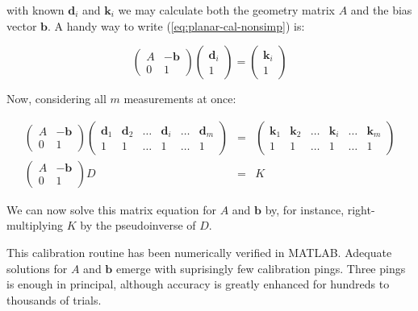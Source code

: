\documentclass[10pt]{article}
\begin{document}
with known \(\mathbf d_i\) and \(\mathbf k_i\) we may calculate both the geometry matrix \(A\) and the bias vector \(\mathbf b\).  A handy way to write (\ref{eq:planar-cal-nonsimp}) is:

\begin{equation}
\label{eq:planar-cal-nonsimp}
\left(\begin{array}{cc}
A & -\mathbf b \\
0 & 1
\end{array}\right)
\left(\begin{array}{c}
\mathbf d_i \\
1
\end{array}\right)
 = 
\left(\begin{array}{c}
\mathbf k_i \\
1
\end{array}\right)
\end{equation}

Now, considering all \(m\) measurements at once:

\begin{eqnarray*}
\label{eq:planar-cAL-simp}
\left(\begin{array}{cc}
A & -\mathbf b \\
0 & 1
\end{array}\right)
\left(\begin{array}{cccccc}
\mathbf d_1 & \mathbf d_2 & \dots & \mathbf d_i & \dots & \mathbf d_m\\
1 & 1 & \dots & 1 & \dots & 1
\end{array}\right) &=&
\left(\begin{array}{cccccc}
\mathbf k_1 & \mathbf k_2 & \dots & \mathbf k_i & \dots & \mathbf k_m\\
1 & 1 & \dots & 1 & \dots & 1
\end{array}\right) \\
\left(\begin{array}{cc}
A & -\mathbf b \\
0 & 1
\end{array}\right) D &=& K
\end{eqnarray*}

We can now solve this matrix equation for \(A\) and \(\mathbf b\) by, for instance, right-multiplying \(K\) by the pseudoinverse of \(D\).

This calibration routine has been numerically verified in MATLAB.  Adequate solutions for \(A\) and \(\mathbf b\) emerge with suprisingly few calibration pings.  Three pings is enough in principal, although accuracy is greatly enhanced for hundreds to thousands of trials.
\end{document}

